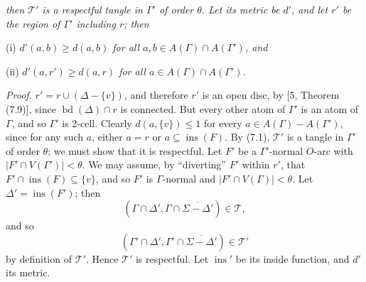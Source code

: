 \noindent \textit{then $\mathscr{T}'$ is a respectful tangle in $\Gamma'$ of order $\theta$. Let its metric be $d'$, and let $r'$ be the region of $\Gamma'$ including $r$; then}

\hspace*{12pt}(i) \textit{$d'(a, b) \ge d(a, b)$ for all $a, b \in A(\Gamma) \cap A(\Gamma')$, and}

\hspace*{12pt}(ii) \textit{$d'(a, r') \ge d(a, r)$ for all $a \in A(\Gamma) \cap A(\Gamma')$.}

\textit{Proof.} $r' = r \cup (\Delta - \{v\})$, and therefore $r'$ is an open disc, by [5, Theorem (7.9)], since $\operatorname{bd}(\Delta) \cap r$ is connected. But every other atom of $\Gamma'$ is an atom of $\Gamma$, and so $\Gamma'$ is 2-cell. Clearly $d(a, \{v\}) \le 1$ for every $a \in A(\Gamma) - A(\Gamma')$, since for any such $a$, either $a = r$ or $a \subseteq \operatorname{ins}(F)$. By (7.1), $\mathscr{T}'$ is a tangle in $\Gamma'$ of order $\theta$; we must show that it is respectful. Let $F'$ be a $\Gamma'$-normal $O$-arc with $|F' \cap V(\Gamma')| < \theta$. We may assume, by ``diverting'' $F'$ within $r'$, that $F' \cap \operatorname{ins}(F) \subseteq \{v\}$, and so $F'$ is $\Gamma$-normal and $|F' \cap V(\Gamma)| < \theta$. Let $\Delta' = \operatorname{ins}(F')$; then
\begin{equation*}
(\Gamma \cap \Delta', \Gamma \cap \overline{\Sigma - \Delta'}) \in \mathscr{T},
\end{equation*}
and so
\begin{equation*}
(\Gamma' \cap \Delta', \Gamma' \cap \overline{\Sigma - \Delta'}) \in \mathscr{T}'
\end{equation*}
by definition of $\mathscr{T}'$. Hence $\mathscr{T}'$ is respectful. Let $\operatorname{ins}'$ be its inside function, and $d'$ its metric.

